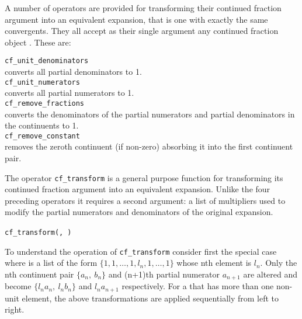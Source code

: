 \hypertarget{operator:CF_UNIT_NUMERATORS}{}
\hypertarget{operator:CF_UNIT_DENOMINATORS}{}
\hypertarget{operator:CF_REMOVE_FRACTIONS}{}
\hypertarget{operator:CF_REMOVE_CONSTANT}{}
A number of operators are provided for transforming their continued
fraction argument  into an equivalent expansion,
that is one with exactly the same convergents.
They all accept as their single argument any continued fraction
object .
These are:

\texttt{cf\_unit\_denominators}\\
converts all partial denominators to 1.\\[\baselineskip]
\texttt{cf\_unit\_numerators}\\
converts all partial numerators to 1.\\[\baselineskip]
\texttt{cf\_remove\_fractions}\\
converts the denominators of the partial numerators and partial
denominators in the continuents to 1.\\[\baselineskip]
\texttt{cf\_remove\_constant}\\
removes the zeroth continuent (if non-zero) absorbing it into the
first continuent pair.

\hypertarget{operator:CF_TRANSFORM}{}
The operator \texttt{cf\_transform}
is a general purpose function
for transforming its continued fraction argument  into
an equivalent expansion. Unlike the four preceding operators it requires
a second argument: a list of multipliers used to modify the partial
numerators and denominators of the original expansion.
\begin{syntaxtable}
  \texttt{cf\_transform(}\texttt{,}\,%
  \texttt{)}
\end{syntaxtable}
To understand the operation of \texttt{cf\_transform} consider first the
special case where  is a list of the
form $\{1, 1, \ldots, 1, l_n, 1, \ldots, 1\}$ whose nth element is $l_n$.
Only the nth continuent pair $\{a_n,\ b_n\}$ and (n+1)th partial numerator
$a_{n+1}$ are altered and become $\{l_na_n,\ l_nb_n\}$ and $l_na_{n+1}$
respectively. For a  that has more than one non-unit
element, the above transformations are applied sequentially from left to
right.


